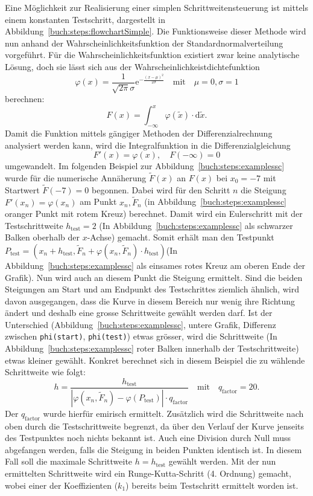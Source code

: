 Eine Möglichkeit zur Realisierung einer simplen Schrittweitensteuerung ist mittels einem konstanten Testschritt,
dargestellt in Abbildung~\ref{buch:steps:flowchartSimple}.
Die Funktionsweise dieser Methode wird nun anhand der Wahrscheinlichkeitsfunktion der Standardnormalverteilung vorgeführt.
Für die Wahrscheinlichkeitsfunktion existiert zwar keine analytische Lösung,
doch sie lässt sich aus der Wahrscheinlichkeistdichtefunktion
\[
  \varphi(x)=\frac{1}{\sqrt{2\pi}\sigma}\mathrm{e}^{-\frac{(x-\mu)^2}{2 \sigma}}\quad \text{mit} \quad \mu=0,\sigma=1
\]
berechnen:
\[
  F(x)=\int_{-\infty}^{x} \varphi (\tilde{x}) \cdot \mathrm{d} \tilde{x}.
\]
Damit die Funktion mittels gängiger Methoden der Differenzialrechnung analysiert werden kann,
wird die Integralfunktion in die Differenzialgleichung
\[
  F'(x)=\varphi(x), \quad F(-\infty)=0
\]
umgewandelt.
Im folgenden Beispiel zur Abbildung~\ref{buch:steps:examplessc}
wurde für die numerische Annäherung $\tilde{F}(x)$ an $F(x)$ bei $x_0=-7$ mit Startwert $\tilde{F}(-7)=0$ begonnen.
Dabei wird für den Schritt $n$ die Steigung $F'(x_n)=\varphi(x_n)$ am Punkt $x_{n}, \tilde{F}_{n}$ (in Abbildung~\ref{buch:steps:examplessc} oranger Punkt mit rotem Kreuz) berechnet.
Damit wird ein Eulerschritt mit der Testschrittweite $h_\text{test}=2$ (In Abbildung~\ref{buch:steps:examplessc} als schwarzer Balken oberhalb der $x$-Achse) gemacht.
Somit erhält man den Testpunkt 
$P_\text{test}=(x_n+h_\text{test}, \tilde{F}_n+\varphi(x_n, \tilde{F}_n) \cdot h_\text{test})$(In Abbildung~\ref{buch:steps:examplessc} als einsames rotes Kreuz am oberen Ende der Grafik).
Nun wird auch an diesem Punkt die Steigung ermittelt.
Sind die beiden Steigungen am Start und am Endpunkt des Testschrittes ziemlich ähnlich, wird davon ausgegangen,
dass die Kurve in diesem Bereich nur wenig ihre Richtung ändert und deshalb eine grosse Schrittweite gewählt werden darf.
Ist der Unterschied (Abbildung~\ref{buch:steps:examplessc},
untere Grafik, Differenz zwischen \texttt{phi(start)}, \texttt{phi(test)}) etwas grösser,
wird die Schrittweite (In Abbildung~\ref{buch:steps:examplessc} roter Balken innerhalb der Testschrittweite) etwas kleiner gewählt.
Konkret berechnet sich in diesem Beispiel die zu wählende Schrittweite wie folgt:
\begin{equation}
  h=\frac{h_{\text{test}}}{|\varphi(x_n, \tilde{F}_n)-\varphi(P_{\text{test}})|\cdot q_{\text{factor}}}\quad \text{mit} \quad q_{\text{factor}}=20.
  \label{buch:steps:equationSimpleStepSize}
\end{equation}
Der $q_\text{factor}$ wurde hierfür emirisch ermittelt.
Zusätzlich wird die Schrittweite nach oben durch die Testschrittweite begrenzt,
da über den Verlauf der Kurve jenseits des Testpunktes noch nichts bekannt ist.
Auch eine Division durch Null muss abgefangen werden, falls die Steigung in beiden Punkten identisch ist.
In diesem Fall soll die maximale Schrittweite $h=h_{\text{test}}$ gewählt werden.
Mit der nun ermittelten Schrittweite wird ein Runge-Kutta-Schritt (4. Ordnung) gemacht,
wobei einer der Koeffizienten ($k_1$) bereits beim Testschritt ermittelt worden ist.

